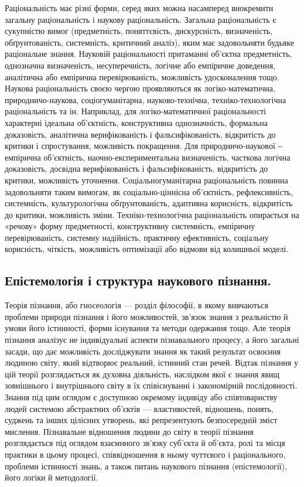 Раціональність має різні форми, серед яких можна насамперед виокремити
загальну раціональність і наукову раціональність. Загальна раціональність є
сукупністю вимог (предметність, поняттєвість, дискурсність, визначеність,
обґрунтованість, системність, критичний аналіз), яким має задовольняти будьяке раціональне знання. Науковій раціональності притаманні об’єктна
предметність, однозначна визначеність, несуперечність, логічне або емпіричне
доведення, аналітична або емпірична перевірюваність, можливість
удосконалення тощо. Наукова раціональність своєю чергою проявляються як
логіко-математична, природничо-наукова, соціогуманітарна, науково-технічна,
техніко-технологічна раціональність та ін. Наприклад, для логіко-математичної
раціональності характерні ідеальна об’єктність, конструктивна однозначність,
формальна доказовість, аналітична верифікованість і фальсифікованість,
відкритість до критики і спростування, можливість покращення. Для
природничо-наукової ‒ емпірична об’єктність, наочно-експериментальна
визначеність, часткова логічна доказовість, досвідна верифікованість і
фальсифікованість, відкритість до критики, можливість уточнення. Соціальногуманітарна раціональність повинна задовольняти таким вимогам, як
соціально-ціннісна об’єктність, рефлексивність, системність, культурологічна
обґрунтованість, адаптивна корисність, відкритість до критики, можливість
зміни. Техніко-технологічна раціональність опирається на «речову» форму
предметності, конструктивну системність, емпіричну перевірюваність,
системну надійність, практичну ефективність, соціальну корисність, чіткість,
можливість оптимізації або відмови від колишньої моделі.

\subsection{Епістемологія і структура наукового пізнання.}
Теорія пізнання, або
гносеологія --- розділ філософії, в якому вивчаються проблеми природи пізнання
і його можливостей, зв’язок знання з реальністю й умови його істинності,
форми існування та методи одержання тощо. Але теорія пізнання аналізує не
індивідуальні аспекти пізнавального процесу, а його загальні засади, що дає
можливість досліджувати знання як такий результат освоєння людиною світу,
який відтворює реальний, істинний стан речей. Відтак пізнання у цій теорії
розглядається як духовна діяльність, наслідком якої є знання явищ зовнішнього
і внутрішнього світу в їх співіснуванні і закономірній послідовності. Знання під
цим оглядом є доступною окремому індивіду або співтовариству людей
системою абстрактних об’єктів --- властивостей, відношень, понять, суджень та
інших цілісних утворень, які репрезентують безпосередній зміст мислення.
Пізнавальне відношення людини до світу в теорії пізнання розглядається під
оглядом взаємнного зв’язку суб’єкта й об’єкта, ролі та місця практики в цьому
процесі, співвідношення в ньому чуттєвого і раціонального, проблеми
істинності знань, а також питань наукового пізнання (епістемології), його
логіки й методології.

